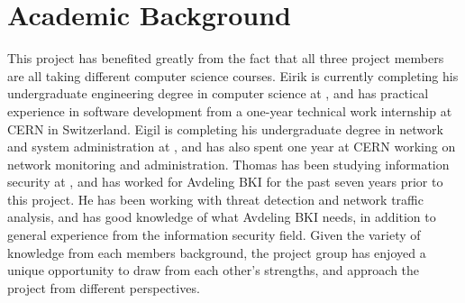 \section{Academic Background}
This project has benefited greatly from the fact that all three project
members are all taking different computer science courses. Eirik is currently
completing his undergraduate engineering degree in computer science at \GUC{},
and has practical experience in software development from a one-year technical
work internship at CERN in Switzerland. Eigil is completing his undergraduate
degree in network and system administration at \GUC{}, and has also spent one
year at CERN working on network monitoring and administration. Thomas has been
studying information security at \GUC{}, and has worked for Avdeling BKI for the
past seven years prior to this project. He has been working with threat
detection and network traffic analysis, and has good knowledge of what Avdeling BKI
needs, in addition to general experience from the information security field.
Given the variety of knowledge from each members background, the project group
has enjoyed a unique opportunity to draw from each other's strengths, and
approach the project from different perspectives.
